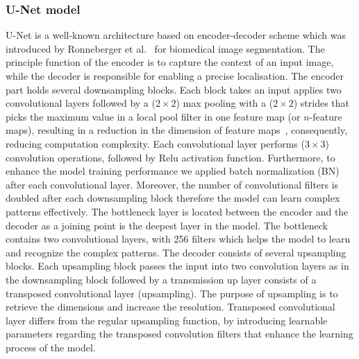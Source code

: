 \subsubsection{U-Net model}
U-Net is a well-known architecture based on encoder-decoder scheme which was introduced by Ronneberger et al.~\cite{Ronneberger2015} for biomedical image segmentation. 
The principle function of the encoder is to capture the context of an input image, while the decoder is responsible for enabling a precise localisation. 
The encoder part holds several downsampling blocks. 
Each block takes an input applies two convolutional layers followed by a (\(2\times2\)) max pooling with a (\(2\times2\)) strides that picks the maximum value in a local pool filter in one feature map (or \(n\)-feature maps), resulting in a reduction in the dimension of feature maps~\cite{Lecun2015}, consequently, reducing computation complexity.
Each convolutional layer performs (\(3\times3\)) convolution operations, followed by Relu activation function.
Furthermore, to enhance the model training performance we applied batch normalization (BN)~\cite{Ioffe2015} after each convolutional layer.
Moreover, the number of convolutional filters is doubled after each downsampling block therefore the model can learn complex patterns effectively. 
The bottleneck layer is located between the encoder and the decoder as a joining point is the deepest layer in the model.
The bottleneck contains two convolutional layers, with 256 filters which helps the model to learn and recognize the complex patterns.
The decoder consists of several upsampling blocks. 
Each upsampling block passes the input into two convolution layers as in the downsampling block followed by a transmission up layer consists of a transposed convolutional layer (upsampling). 
The purpose of upsampling is to retrieve the dimensions and increase the resolution.
Transposed convolutional layer differs from the regular upsampling function, by introducing learnable parameters regarding the transposed convolution filters that enhance the learning process of the model. 
